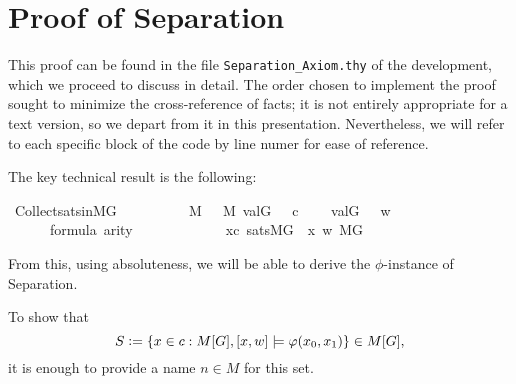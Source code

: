 \section{Proof of Separation}
\label{sec:proof-separation}

This proof can be found in the file \verb|Separation_Axiom.thy| of the
development, which we proceed to discuss in detail. The order chosen to
implement
the proof sought to minimize the cross-reference of facts;  it is
not entirely appropriate for a text version, so we depart from it in
this presentation. Nevertheless, we will refer to each specific block
of the code by line numer for ease of reference.

The key technical result is the following:
\begin{isabelle}
  \isamarkupfalse%
  \ Collect{\isacharunderscore}sats{\isacharunderscore}in{\isacharunderscore}MG\ {\isacharcolon}\isanewline
  \ \ \isanewline
  \ \ \ \ {\isachardoublequoteopen}{\isasympi}\ {\isasymin}\ M{\isachardoublequoteclose}\ {\isachardoublequoteopen}{\isasymsigma}\ {\isasymin}\ M{\isachardoublequoteclose}\ {\isachardoublequoteopen}val{\isacharparenleft}G{\isacharcomma}\ {\isasympi}{\isacharparenright}\ {\isacharequal}\ c{\isachardoublequoteclose}\isanewline
  \ \ \ \  {\isachardoublequoteopen}val{\isacharparenleft}G{\isacharcomma}\ {\isasymsigma}{\isacharparenright}\ {\isacharequal}\ w{\isachardoublequoteclose}\isanewline
  \ \ \ \ {\isachardoublequoteopen}{\isasymphi}\ {\isasymin}\ formula{\isachardoublequoteclose}\ {\isachardoublequoteopen}arity{\isacharparenleft}{\isasymphi}{\isacharparenright}\ {\isasymle}\ {}{\isachardoublequoteclose}\isanewline
  \ \ \ \ \ \ \isanewline
  \ \ \ \ {\isachardoublequoteopen}{\isacharbraceleft}x{\isasymin}c{\isachardot}\ sats{\isacharparenleft}M{\isacharbrackleft}G{\isacharbrackright}{\isacharcomma}\ {\isasymphi}{\isacharcomma}\ {\isacharbrackleft}x{\isacharcomma}\ w{\isacharbrackright}{\isacharparenright}{\isacharbraceright}{\isasymin}\ M{\isacharbrackleft}G{\isacharbrackright}{\isachardoublequoteclose}
\end{isabelle}
%
From this, using absoluteness, we will be able to derive the
$\phi$-instance of Separation. 

To show that   
\[
S\mathrel{\mathop:}=\{x\in c : M[G],[x,w]\models \varphi(x_0,x_1)\} \in M[G],
\]
it is enough to provide a name $n\in M$ for this set.
 
